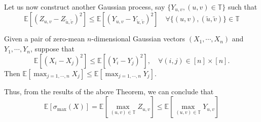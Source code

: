 \documentclass[10pt,handout,english]{beamer}
\newcommand{\E}{\mathbb{E}}
\newcommand{\T}{\mathbb{T}}
\begin{document}
\begin{frame}[allowframebreaks]
Let us now construct another Gaussian process, say $\{Y_{u,v},(u,v)\in\T\}$ such that 
\[
\E[(Z_{u,v}-Z_{\tilde{u},\tilde{v}})^2]\leq\E\left[(Y_{u,v}-Y_{\tilde{u},\tilde{v}})^2\right]\quad \forall \{(u,v),(\tilde{u},\tilde{v})\}\in\T
\]
\begin{Theorem}
Given a pair of zero-mean $n$-dimensional Gaussian vectors $(X_1,\cdots,X_n)$ and $Y_1,\cdots,Y_n$, suppose that
\[
\E[(X_i-X_j)^2]\leq\E[(Y_i-Y_j)^2],\quad\forall (i,j)\in [n]\times [n]. 
\]
Then $\E[\max_{j=1,\cdots,n}X_j]\leq\E[\max_{j=1,\cdots,n}Y_j]$.
\end{Theorem}
Thus, from the results of the above Theorem, we can conclude that
\[
\E[\sigma_{\max}(X)]=\E[\max_{(u,v)\in\T}Z_{u,v}]\leq \E[\max_{(u,v)\in\T}Y_{u,v}]
\] 
\end{frame}
\end{document}
